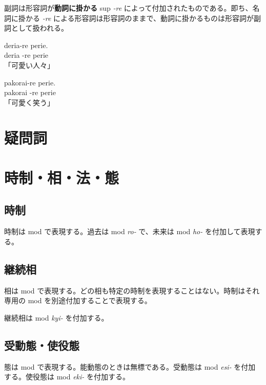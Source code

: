 副詞は形容詞が\textbf{動詞に掛かる} sup \emph{-re} によって付加されたものである。即ち、名詞に掛かる \emph{-re} による形容詞は形容詞のままで、動詞に掛かるものは形容詞が副詞として扱われる。

\begin{multicols}{2}
    \begin{pindent}
        \noindent
        deria-re perie. \vspace{-1mm} \\
        deria -re perie \vspace{-1mm} \\
        「可愛い人々」
    \end{pindent}

    \columnbreak

    \begin{pindent}
        \noindent
        pakorai-re perie. \vspace{-1mm} \\
        pakorai -re perie \vspace{-1mm} \\
        「可愛く笑う」
    \end{pindent}
\end{multicols}

\section{疑問詞}

\section{時制・相・法・態}

\subsection{時制}

時制は mod で表現する。過去は mod \emph{ro-} で、未来は mod \emph{ho-} を付加して表現する。

\subsection{継続相}

相は mod で表現する。どの相も特定の時制を表現することはない。時制はそれ専用の mod を別途付加することで表現する。

継続相は mod \emph{kyi-} を付加する。

\subsection{受動態・使役態}

態は mod で表現する。能動態のときは無標である。受動態は mod \emph{esi-} を付加する。使役態は mod \emph{eki-} を付加する。